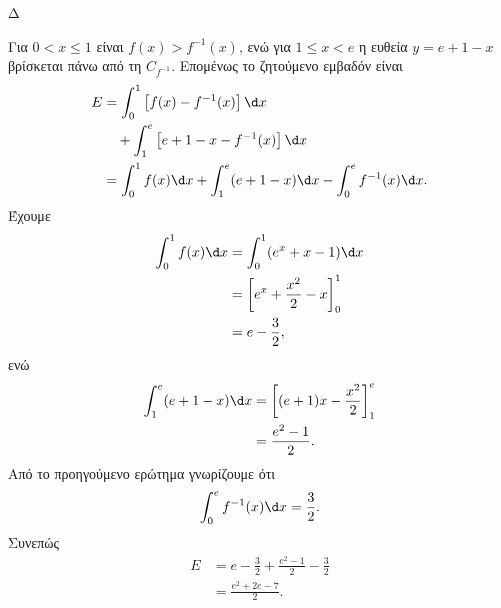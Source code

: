 \begin{thema}{Δ}
\begin{erwthma}
Για $0<x\leq1$ είναι $f(x)>f^{-1}(x)$, ενώ για $1\leq x<e$ η ευθεία $y=e+1-x$ βρίσκεται πάνω από τη $C_{f^{-1}}$. Επομένως το ζητούμενο εμβαδόν είναι
\begin{align*}
E
&=\int_0^1\left[f(x)-f^{-1}(x)\right]\d x\\
&\quad+\int_1^e\left[e+1-x-f^{-1}(x)\right]\d x\\
&=\int_0^1f(x)\d x
+\int_1^e(e+1-x)\d x
-\int_0^e f^{-1}(x)\d x.
\end{align*}
Έχουμε
\begin{align*}
\int_0^1f(x)\d x
&=\int_0^1(e^x+x-1)\d x\\
&=\left[e^x+\frac{x^2}{2}-x\right]_0^1\\
&=e-\frac{3}{2},
\end{align*}
ενώ
\begin{align*}
\int_1^e(e+1-x)\d x
&=\left[(e+1)x-\frac{x^2}{2}\right]_1^e\\
&=\frac{e^2-1}{2}.
\end{align*}
Από το προηγούμενο ερώτημα γνωρίζουμε ότι
\[
\int_0^e f^{-1}(x)\d x=\frac{3}{2}.
\]
Συνεπώς
\begin{align*}
E
&=e-\frac{3}{2}+\frac{e^2-1}{2}-\frac{3}{2}\\
&={\frac{e^2+2e-7}{2}}.
\end{align*}
\end{erwthma}
\end{thema}

